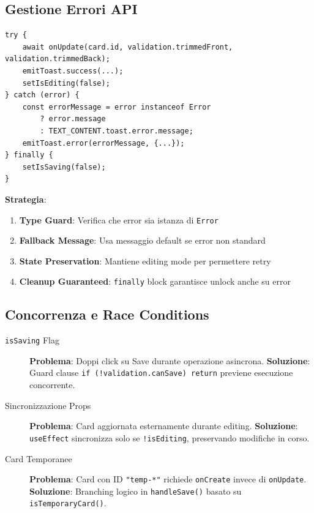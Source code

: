 \documentclass[11pt,a4paper]{article}
\begin{document}
\subsection{Gestione Errori API}

\begin{lstlisting}[style=typescript, caption=Error Handling Pattern]
try {
    await onUpdate(card.id, validation.trimmedFront, validation.trimmedBack);
    emitToast.success(...);
    setIsEditing(false);
} catch (error) {
    const errorMessage = error instanceof Error 
        ? error.message 
        : TEXT_CONTENT.toast.error.message;
    emitToast.error(errorMessage, {...});
} finally {
    setIsSaving(false);
}
\end{lstlisting}

\textbf{Strategia}:
\begin{enumerate}
    \item \textbf{Type Guard}: Verifica che error sia istanza di \texttt{Error}
    \item \textbf{Fallback Message}: Usa messaggio default se error non standard
    \item \textbf{State Preservation}: Mantiene editing mode per permettere retry
    \item \textbf{Cleanup Guaranteed}: \texttt{finally} block garantisce unlock anche su error
\end{enumerate}

\subsection{Concorrenza e Race Conditions}

\begin{description}
    \item[\texttt{isSaving} Flag] \textbf{Problema}: Doppi click su Save durante operazione asincrona. \textbf{Soluzione}: Guard clause \texttt{if (!validation.canSave) return} previene esecuzione concorrente.
    
    \item[Sincronizzazione Props] \textbf{Problema}: Card aggiornata esternamente durante editing. \textbf{Soluzione}: \texttt{useEffect} sincronizza solo se \texttt{!isEditing}, preservando modifiche in corso.
    
    \item[Card Temporanee] \textbf{Problema}: Card con ID \texttt{"temp-*"} richiede \texttt{onCreate} invece di \texttt{onUpdate}. \textbf{Soluzione}: Branching logico in \texttt{handleSave()} basato su \texttt{isTemporaryCard()}.
\end{description}
\end{document}
